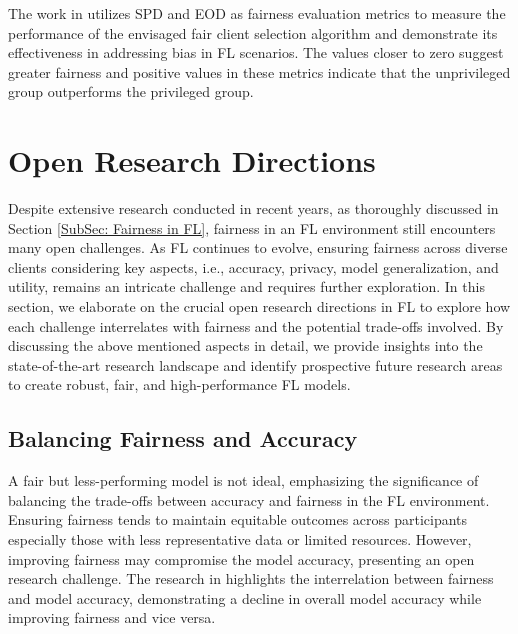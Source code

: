 \documentclass{article}
\begin{document}
The work in \cite{ezzeldin,hamman2024demystifying_ICLR24} utilizes SPD and EOD as fairness evaluation metrics to measure the performance of the envisaged fair client selection algorithm and demonstrate its effectiveness in addressing bias in FL scenarios. The values closer to zero suggest greater fairness and positive values in these metrics indicate that the unprivileged group outperforms the privileged group.

\section{Open Research Directions}
\label{Sec: Open Research Directions}
Despite extensive research conducted in recent years, as thoroughly discussed in Section \ref{SubSec: Fairness in FL}, fairness in an FL environment still encounters
many open challenges. As FL continues to evolve, ensuring fairness across diverse clients considering key aspects, i.e., accuracy, privacy, model generalization, and utility, remains an intricate challenge and
requires further exploration. 
In this section, we elaborate on the crucial open research directions in FL to explore how each challenge interrelates with fairness and the potential trade-offs involved. By discussing the above mentioned aspects in detail, we provide insights into the state-of-the-art research landscape and identify prospective future research areas to create robust, fair, and high-performance FL models.

\subsection{Balancing Fairness and Accuracy}
\label{SubSec: Balancing Fairness and Accuracy}
A fair but less-performing model is not ideal, emphasizing the significance of balancing the trade-offs between accuracy and fairness in the FL environment. Ensuring fairness tends to maintain equitable outcomes across participants especially those with less representative data or limited resources. However, improving fairness may compromise the model accuracy, presenting an open research challenge. The research in \cite{lewis2024ensuring} highlights the interrelation between fairness and model accuracy, demonstrating a decline in overall model accuracy while improving fairness and vice versa.
\end{document}
